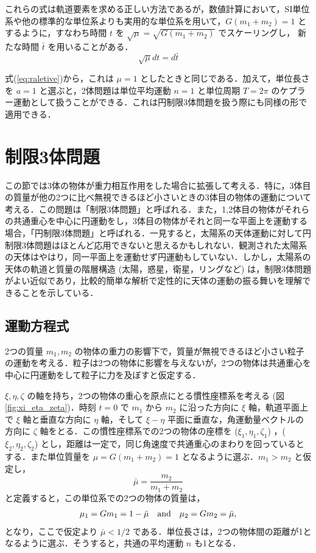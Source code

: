 \documentclass[11pt,a4paper,oneside,onecolumn]{jreport}
\begin{document}
これらの式は軌道要素を求める正しい方法であるが，数値計算において，SI単位系や他の標準的な単位系よりも実用的な単位系を用いて，$G (m_1 + m_2) = 1$ とするように，すなわち時間 $t$ を $\sqrt{\mu} = \sqrt{G (m_1 + m_2)}$ でスケーリングし， 新たな時間 $\bar{t}$ を用いることがある．
\begin{equation}
\sqrt{\mu} dt = d \bar{t} \label{eq:tbar}
\end{equation}

式(\ref{eq:raletive})から，これは $\mu = 1$ としたときと同じである．加えて，単位長さを $a = 1$ と選ぶと，2体問題は単位平均運動 $n = 1$ と単位周期 $T = 2 \pi$ のケプラー運動として扱うことができる．これは円制限3体問題を扱う際にも同様の形で適用できる．


\section{制限3体問題 \label{sec:3body}}
この節では3体の物体が重力相互作用をした場合に拡張して考える．特に，3体目の質量が他の2つに比べ無視できるほど小さいときの3体目の物体の運動について考える．この問題は「制限3体問題」と呼ばれる．また，1,2体目の物体がそれらの共通重心を中心に円運動をし，3体目の物体がそれと同一な平面上を運動する場合，「円制限3体問題」と呼ばれる．一見すると，太陽系の天体運動に対して円制限3体問題はほとんど応用できないと思えるかもしれない．観測された太陽系の天体はやはり，同一平面上を運動せず円運動もしていない．しかし，太陽系の天体の軌道と質量の階層構造 (太陽，惑星，衛星，リングなど) は，制限3体問題がよい近似であり，比較的簡単な解析で定性的に天体の運動の振る舞いを理解できることを示している．

\subsection{運動方程式}
2つの質量 $m_1, m_2$ の物体の重力の影響下で，質量が無視できるほど小さい粒子の運動を考える．粒子は2つの物体に影響を与えないが，2つの物体は共通重心を中心に円運動をして粒子に力を及ぼすと仮定する．

$\xi, \eta, \zeta$ の軸を持ち，2つの物体の重心を原点にとる慣性座標系を考える (図\ref{fig:xi_eta_zeta})．時刻 $t = 0$ で $m_1$ から $m_2$ に沿った方向に $\xi$ 軸，軌道平面上で $\xi$ 軸と垂直な方向に $\eta$ 軸，そして $\xi - \eta$ 平面に垂直な，角運動量ベクトルの方向に $\zeta$ 軸をとる．この慣性座標系での2つの物体の座標を ($\xi_1, \eta_1, \zeta_1$) ，($\xi_2, \eta_2, \zeta_2$) とし，距離は一定で，同じ角速度で共通重心のまわりを回っているとする．また単位質量を $\mu = G (m_1 + m_2) = 1$ となるように選ぶ．$m_1 > m_2$ と仮定し，
\begin{equation}
\bar{\mu} = \frac{m_2}{m_1 + m_2}
\end{equation}
と定義すると，この単位系での2つの物体の質量は，
\begin{equation}
\mu_1 = G m_1 = 1 - \bar{\mu} \quad {\rm and} \quad \mu_2 = G m_2 = \bar{\mu}, \label{eq:mu1mu2}
\end{equation}
となり，ここで仮定より $\bar{\mu} < 1/2$ である．単位長さは，2つの物体間の距離が1となるように選ぶ．そうすると，共通の平均運動 $n$ も1となる．
\end{document}
